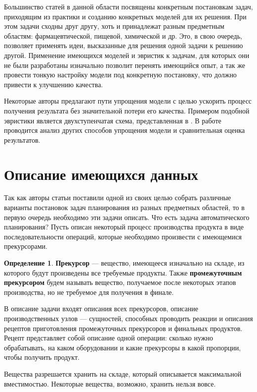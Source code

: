\documentclass[12pt, twoside]{article}
\theoremstyle{definition}
\newtheorem{definition}[section]{Определение}
\begin{document}
Большинство статей в данной области посвящены конкретным постановкам задач, приходящим из практики и созданию конкретных моделей для их решения. При этом задачи сходны друг другу, хоть и принадлежат разным предметным областям: фармацевтической, пищевой, химической и др. Это, в свою очередь, позволяет применять идеи, высказанные для решения одной задачи к решению другой. Применение имеющихся моделей и эвристик к задачам, для которых они не были разработаны изначально позволит перенять имеющийся опыт, а так же провести тонкую настройку модели под конкретную постановку, что должно привести к улучшению качества. 

Некоторые авторы предлагают пути упрощения модели с целью ускорить процесс получения результата без значительной потери его качества. Примером подобной эвристики является двухступенчатая схема, представленная в \cite{lpheuristic}. В работе проводится анализ других способов упрощения модели и сравнительная оценка результатов.

\section{Описание имеющихся данных}
Так как авторы статьи поставили одной из своих целью собрать различные варианты постановок задач планирования из разных предметных областей, то в первую очередь необходимо эти задачи описать. Что есть задача автоматического планирования? Пусть описан некоторый процесс производства продукта в виде последовательности операций, которые необходимо произвести с имеющемися прекурсорами.

\begin{definition} \textbf{Прекурсор} --- вещество, имеющееся изначально на складе, из которого будут произведены все требуемые продукты. Также \textbf{промежуточным прекурсором} будем называть вещество, получаемое после некоторых этапов производства, но не требуемое для получения в финале.
\end{definition}

В описание задачи входят описания всех прекурсоров, описание производственных узлов --- сущностей, способных проводить реакции и описания рецептов приготовления промежуточных прекурсоров и финальных продуктов. Рецепт представляет собой описание одной операции: сколько нужно обрабатывать, на каком оборудовании и какие прекурсоры в какой пропорции, чтобы получить продукт. 

Вещества разрешается хранить на складе, который описывается максимальной вместимостью. Некоторые вещества, возможно, хранить нельзя вовсе.
\end{document}
